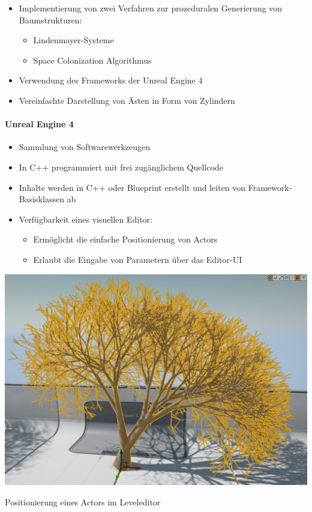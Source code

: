 \begin{itemize}
	\item Implementierung von zwei Verfahren zur prozeduralen Generierung von Baumstrukturen:
	\begin{itemize}
		\item Lindenmayer-Systeme
		\item Space Colonization Algorithmus
	\end{itemize}
	\item Verwendung des Frameworks der Unreal Engine 4
	\item Vereinfachte Darstellung von Ästen in Form von Zylindern
\end{itemize}

\newpage
{}
\paragraph{Unreal Engine 4\\}

\begin{itemize}
	\item Sammlung von Softwarewerkzeugen
	\item In C++ programmiert mit frei zugänglichem Quellcode
	\item Inhalte werden in C++ oder Blueprint erstellt und leiten von Framework-Basisklassen ab
	\item Verfügbarkeit eines visuellen Editor:
	\begin{itemize}
		\item Ermöglicht die einfache Positionierung von Actors
		\item Erlaubt die Eingabe von Parametern über das Editor-UI
	\end{itemize}
\end{itemize}

\newpage
\begin{center}
	\includegraphics[height=0.9\textheight]{images/CH1_EditorExample1.png}
	
	Positionierung eines Actors im Leveleditor
\end{center}


